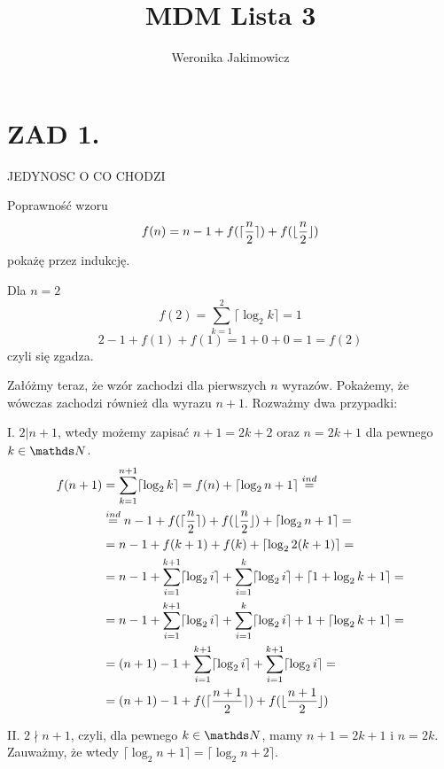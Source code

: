 \documentclass{article}[13pt]
\author{Weronika Jakimowicz}
\title{MDM Lista 3}
\date{}
\begin{document}
    \maketitle

    \section*{ZAD 1.}

    {\color{acc}JEDYNOSC O CO CHODZI}
    \bigskip
    
    Poprawność wzoru
    $$f(n)=n-1+f(\lceil{n\over 2}\rceil)+f(\lfloor{n\over2}\rfloor)$$
    pokażę przez indukcję.
    \medskip

    Dla $n=2$
    $$f(2)=\sum\limits_{k=1}^2\lceil\log_2k\rceil=1$$
    $$2-1+f(1)+f(1)=1+0+0=1=f(2)$$
    czyli się zgadza.
    \medskip

    Załóżmy teraz, że wzór zachodzi dla pierwszych $n$ wyrazów. Pokażemy, że wówczas zachodzi również dla wyrazu $n+1$. Rozważmy dwa przypadki:
    \smallskip

    I. $2|n+1$, wtedy możemy zapisać $n+1=2k+2$ oraz $n=2k+1$ dla pewnego $k\in\N$.
    \begin{align*}
        f(n+1)&=\sum\limits_{k=1}^{n+1}\lceil\log_2k\rceil=f(n)+\lceil\log_2n+1\rceil\overset{ind}{=}\\
        &\overset{ind}{=}n-1+f(\lceil{n\over2}\rceil)+f(\lfloor{n\over2}\rfloor)+\lceil\log_2n+1\rceil=\\
        &=n-1+f(k+1)+f(k)+\lceil\log_22(k+1)\rceil=\\
        &=n-1+\sum\limits_{i=1}^{k+1}\lceil\log_2i\rceil+\sum\limits_{i=1}^k\lceil\log_2i\rceil+\lceil1+\log_2k+1\rceil=\\
        &=n-1+\sum\limits_{i=1}^{k+1}\lceil\log_2i\rceil+\sum\limits_{i=1}^k\lceil\log_2i\rceil+1+\lceil\log_2k+1\rceil=\\
        &=(n+1)-1+\sum\limits_{i=1}^{k+1}\lceil\log_2i\rceil+\sum\limits_{i=1}^{k+1}\lceil\log_2i\rceil=\\
        &=(n+1)-1+f(\lceil{n+1\over2}\rceil)+f(\lfloor{n+1\over2}\rfloor)
    \end{align*}

    II. $2\nmid n+1$, czyli, dla pewnego $k\in\N$, mamy $n+1=2k+1$ i $n=2k$. Zauważmy, że wtedy $\lceil\log_2n+1\rceil=\lceil\log_2n+2\rceil$.
\end{document}
